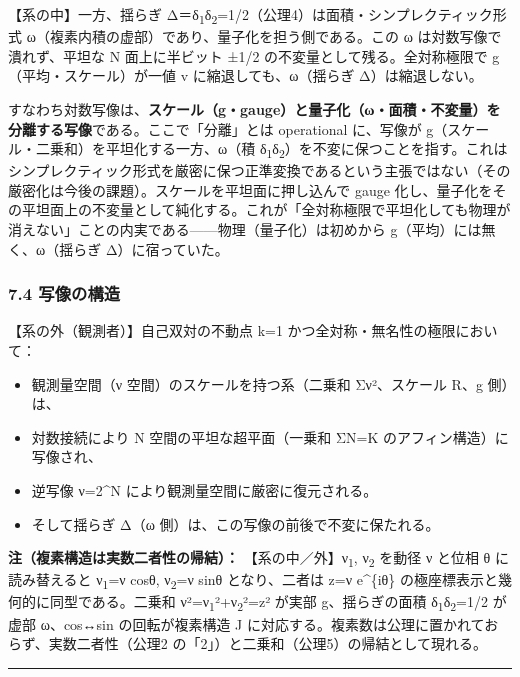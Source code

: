 \documentclass[11pt]{ltjsarticle}
\providecommand{\tightlist}{\setlength{\itemsep}{0pt}\setlength{\parskip}{0pt}}
\begin{document}
【系の中】一方、揺らぎ
Δ＝δ\textsubscript{1}δ\textsubscript{2}=1/2（公理4）は面積・シンプレクティック形式
ω（複素内積の虚部）であり、量子化を担う側である。この ω
は対数写像で潰れず、平坦な N 面上に半ビット ±1/2
の不変量として残る。全対称極限で g（平均・スケール）が一値 v
に縮退しても、ω（揺らぎ Δ）は縮退しない。

すなわち対数写像は、\textbf{スケール（g・gauge）と量子化（ω・面積・不変量）を分離する写像}である。ここで「分離」とは
operational に、写像が g（スケール・二乗和）を平坦化する一方、ω（積
δ\textsubscript{1}δ\textsubscript{2}）を不変に保つことを指す。これはシンプレクティック形式を厳密に保つ正準変換であるという主張ではない（その厳密化は今後の課題）。スケールを平坦面に押し込んで
gauge
化し、量子化をその平坦面上の不変量として純化する。これが「全対称極限で平坦化しても物理が消えない」ことの内実である------物理（量子化）は初めから
g（平均）には無く、ω（揺らぎ Δ）に宿っていた。

\subsubsection{7.4 写像の構造}\label{ux5199ux50cfux306eux69cbux9020}

【系の外（観測者）】自己双対の不動点 k=1
かつ全対称・無名性の極限において：

\begin{itemize}
\tightlist
\item
  観測量空間（ν 空間）のスケールを持つ系（二乗和 Σν²、スケール R、g
  側）は、
\item
  対数接続により N 空間の平坦な超平面（一乗和 ΣN=K
  のアフィン構造）に写像され、
\item
  逆写像 ν=2\^{}N により観測量空間に厳密に復元される。
\item
  そして揺らぎ Δ（ω 側）は、この写像の前後で不変に保たれる。
\end{itemize}

\textbf{注（複素構造は実数二者性の帰結）：} 【系の中／外】ν\textsubscript{1}, ν\textsubscript{2} を動径
ν と位相 θ に読み替えると ν\textsubscript{1}=ν cosθ, ν\textsubscript{2}=ν sinθ となり、二者は z=ν
e\^{}\{iθ\} の極座標表示と幾何的に同型である。二乗和
ν²=ν\textsubscript{1}²+ν\textsubscript{2}²=\textbar z\textbar² が実部 g、揺らぎの面積 δ\textsubscript{1}δ\textsubscript{2}=1/2 が虚部
ω、cos↔sin の回転が複素構造 J
に対応する。複素数は公理に置かれておらず、実数二者性（公理2
の「2」）と二乗和（公理5）の帰結として現れる。

\begin{center}\rule{0.5\linewidth}{0.5pt}\end{center}
\end{document}
